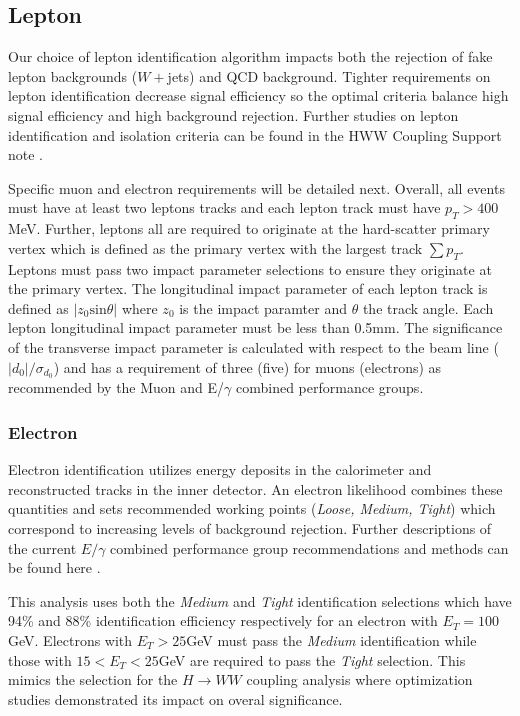 \subsection{Lepton}

Our choice of lepton identification algorithm impacts both the rejection of fake lepton backgrounds ($W+$jets) and QCD background. Tighter requirements on lepton identification decrease signal efficiency so the optimal criteria balance high signal efficiency and high background rejection. Further studies on lepton identification and isolation criteria can be found in the HWW Coupling Support note \cite{HWWCoupling}.

Specific muon and electron requirements will be detailed next. Overall, all events must have at least two leptons tracks and each lepton track must have $p_T>400$MeV. Further, leptons all are required to originate at the hard-scatter primary vertex which is defined as the primary vertex with the largest track $\sum p_T$. Leptons must pass two impact parameter selections to ensure they originate at the primary vertex. The longitudinal impact parameter of each lepton track is defined as $|z_0\mathrm{sin}\theta|$ where $z_0$ is the impact paramter and $\theta$ the track angle. Each lepton longitudinal impact parameter must be less than 0.5mm. The significance of the transverse impact parameter is calculated with respect to the beam line ($|d_0|/\sigma_{d_0}$) and has a requirement of three (five) for muons (electrons) as recommended by the Muon and E/$\gamma$ combined performance groups. 

\subsubsection{Electron}
Electron identification utilizes energy deposits in the calorimeter and reconstructed tracks in the inner detector. An electron likelihood combines these quantities and sets recommended working points (\textit{Loose, Medium, Tight}) which correspond to increasing levels of background rejection. Further descriptions of the current $E/\gamma$ combined performance group recommendations and methods can be found here \cite{ATL-PHYS-PUB-2015-041}.

This analysis uses both the \textit{Medium} and \textit{Tight} identification selections which have 94\% and 88\% identification efficiency respectively for an electron with $E_T=100$ GeV. Electrons with $E_T>25$GeV must pass the \textit{Medium} identification while those with $15<E_T<25$GeV are required to pass the \textit{Tight} selection. This mimics the selection for the $H\rightarrow WW$ coupling analysis where optimization studies demonstrated its impact on overal significance. 

